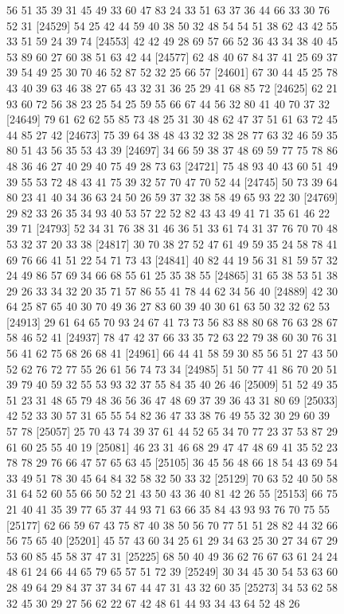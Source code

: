 \documentclass{article}
\begin{document}
\begin{figure}[H]
\begin{Schunk}
\begin{Soutput}
[24505] 56 51 35 39 31 45 49 33 60 47 83 24 33 51 63 37 36 44 66 33 30 76 52 31
[24529] 54 25 42 44 59 40 38 50 32 48 54 54 51 38 62 43 42 55 33 51 59 24 39 74
[24553] 42 42 49 28 69 57 66 52 36 43 34 38 40 45 53 89 60 27 60 38 51 63 42 44
[24577] 62 48 40 67 84 37 41 25 69 37 39 54 49 25 30 70 46 52 87 52 32 25 66 57
[24601] 67 30 44 45 25 78 43 40 39 63 46 38 27 65 43 32 31 36 25 29 41 68 85 72
[24625] 62 21 93 60 72 56 38 23 25 54 25 59 55 66 67 44 56 32 80 41 40 70 37 32
[24649] 79 61 62 62 55 85 73 48 25 31 30 48 62 47 37 51 61 63 72 45 44 85 27 42
[24673] 75 39 64 38 48 43 32 32 38 28 77 63 32 46 59 35 80 51 43 56 35 53 43 39
[24697] 34 66 59 38 37 48 69 59 77 75 78 86 48 36 46 27 40 29 40 75 49 28 73 63
[24721] 75 48 93 40 43 60 51 49 39 55 53 72 48 43 41 75 39 32 57 70 47 70 52 44
[24745] 50 73 39 64 80 23 41 40 34 36 63 24 50 26 59 37 32 38 58 49 65 93 22 30
[24769] 29 82 33 26 35 34 93 40 53 57 22 52 82 43 43 49 41 71 35 61 46 22 39 71
[24793] 52 34 31 76 38 31 46 36 51 33 61 74 31 37 76 70 70 48 53 32 37 20 33 38
[24817] 30 70 38 27 52 47 61 49 59 35 24 58 78 41 69 76 66 41 51 22 54 71 73 43
[24841] 40 82 44 19 56 31 81 59 57 32 24 49 86 57 69 34 66 68 55 61 25 35 38 55
[24865] 31 65 38 53 51 38 29 26 33 34 32 20 35 71 57 86 55 41 78 44 62 34 56 40
[24889] 42 30 64 25 87 65 40 30 70 49 36 27 83 60 39 40 30 61 63 50 32 32 62 53
[24913] 29 61 64 65 70 93 24 67 41 73 73 56 83 88 80 68 76 63 28 67 58 46 52 41
[24937] 78 47 42 37 66 33 35 72 63 22 79 38 60 30 76 31 56 41 62 75 68 26 68 41
[24961] 66 44 41 58 59 30 85 56 51 27 43 50 52 62 76 72 77 55 26 61 56 74 73 34
[24985] 51 50 77 41 86 70 20 51 39 79 40 59 32 55 53 93 32 37 55 84 35 40 26 46
[25009] 51 52 49 35 51 23 31 48 65 79 48 36 56 36 47 48 69 37 39 36 43 31 80 69
[25033] 42 52 33 30 57 31 65 55 54 82 36 47 33 38 76 49 55 32 30 29 60 39 57 78
[25057] 25 70 43 74 39 37 61 44 52 65 34 70 77 23 37 53 87 29 61 60 25 55 40 19
[25081] 46 23 31 46 68 29 47 47 48 69 41 35 52 23 78 78 29 76 66 47 57 65 63 45
[25105] 36 45 56 48 66 18 54 43 69 54 33 49 51 78 30 45 64 84 32 58 32 50 33 32
[25129] 70 63 52 40 50 58 31 64 52 60 55 66 50 52 21 43 50 43 36 40 81 42 26 55
[25153] 66 75 21 40 41 35 39 77 65 37 44 93 71 63 66 35 84 43 93 93 76 70 75 55
[25177] 62 66 59 67 43 75 87 40 38 50 56 70 77 51 51 28 82 44 32 66 56 75 65 40
[25201] 45 57 43 60 34 25 61 29 34 63 25 30 27 34 67 29 53 60 85 45 58 37 47 31
[25225] 68 50 40 49 36 62 76 67 63 61 24 24 48 61 24 66 44 65 79 65 57 51 72 39
[25249] 30 34 45 30 54 53 63 60 28 49 64 29 84 37 37 34 67 44 47 31 43 32 60 35
[25273] 34 53 62 58 32 45 30 29 27 56 62 22 67 42 48 61 44 93 34 43 64 52 48 26

\end{Soutput}
\end{Schunk}
\end{figure}
\end{document}
